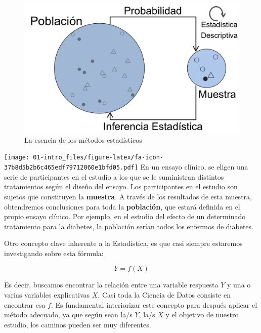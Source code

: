 \documentclass[
]{book}
\begin{document}
\begin{figure}

{\centering \includegraphics[width=1\linewidth]{images/dogma1} 

}

\caption{La esencia de los métodos estadísticos}\label{fig:dogma1}
\end{figure}

\begin{rmdejemplo}
\texttt{[image: 01-intro\_files/figure-latex/fa-icon-37b8d5b2b6c465edf79712060e1bfd05.pdf]} En un ensayo clínico, se eligen una serie de participantes en el estudio a los
que se le suministran distintos tratamientos según el diseño del ensayo.
Los participantes en el estudio son sujetos que constituyen la \textbf{muestra}.
A través de los resultados de esta muestra, obtendremos conclusiones
para toda la \textbf{población}, que estará definida en el propio ensayo clínico.
Por ejemplo, en el estudio del efecto de un determinado tratamiento para la
diabetes, la población serían todos los enfermos de diabetes.

\end{rmdejemplo}

Otro concepto clave inherente a la Estadística, es que casi siempre estaremos
investigando sobre esta fórmula:

\[Y=f(X)\]

Es decir, buscamos encontrar la relación entre una variable respuesta \(Y\) y una o varias
variables explicativas \(X\). Casi toda la Ciencia de Datos consiste en encontrar esa \(f\).
Es fundamental interiorizar este concepto para después aplicar el método adecuado,
ya que según sean la/s \(Y\), la/s \(X\) y el objetivo de nuestro estudio, los caminos
pueden ser muy diferentes.
\end{document}
